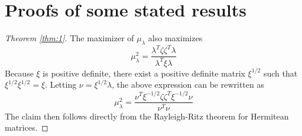\documentclass[draftcls]{IEEEtran}
\theoremstyle{definition}
\begin{document}
\section{Proofs of some stated results}
\label{sec:proofs-some-stated}
\begin{proof}[Theorem \ref{thm:1}]
  The maximizer of $\mu_\lambda$ also maximizes
  \begin{equation*}
    \mu_{\lambda}^{2} = \frac{\lambda^{T} \zeta \zeta^{T}
      \lambda}{\lambda^{T} \xi \lambda}
  \end{equation*}
  Because $\xi$ is positive definite, there exist a positive definite matrix
  $\xi^{1/2}$ such that $\xi^{1/2} \xi^{1/2} = \xi$. Letting $\nu = \xi^{1/2}
  \lambda$, the above expression can be rewritten as
  \begin{equation*}
    \mu_{\lambda}^{2} = \frac{\nu^{T} \xi^{-1/2} \zeta \zeta^{T}
      \xi^{-1/2} \nu}{ \nu^{T} \nu}
  \end{equation*}
  The claim then follows directly from the Rayleigh-Ritz theorem for
  Hermitean matrices.
\end{proof}
\end{document}
